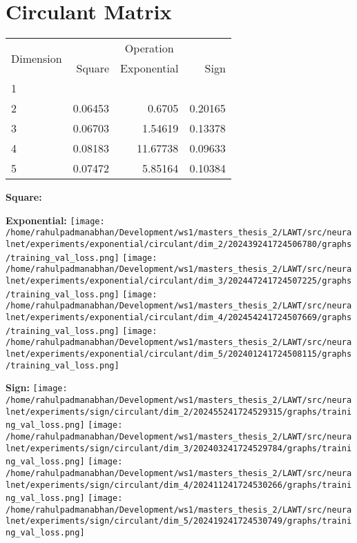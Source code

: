 \documentclass{article}
\begin{document}
\pagebreak
\section{Circulant Matrix}
\begin{tabular}{@{}lrrr@{}}
\toprule
\multirow{2}{*}{Dimension} & \multicolumn{3}{c}{Operation} \\
\cmidrule(l){2-4}
& Square & Exponential & Sign \\
\midrule
1 & & & \\
2 & 0.06453 & 0.6705 & 0.20165 \\
3 & 0.06703 & 1.54619 & 0.13378 \\
4 & 0.08183 & 11.67738 & 0.09633 \\
5 & 0.07472 & 5.85164 & 0.10384 \\
\bottomrule
\end{tabular}

\textbf{Square:}

\textbf{Exponential:}
\texttt{[image: /home/rahulpadmanabhan/Development/ws1/masters\_thesis\_2/LAWT/src/neuralnet/experiments/exponential/circulant/dim\_2/202439241724506780/graphs/training\_val\_loss.png]}
\texttt{[image: /home/rahulpadmanabhan/Development/ws1/masters\_thesis\_2/LAWT/src/neuralnet/experiments/exponential/circulant/dim\_3/202447241724507225/graphs/training\_val\_loss.png]}
\texttt{[image: /home/rahulpadmanabhan/Development/ws1/masters\_thesis\_2/LAWT/src/neuralnet/experiments/exponential/circulant/dim\_4/202454241724507669/graphs/training\_val\_loss.png]}
\texttt{[image: /home/rahulpadmanabhan/Development/ws1/masters\_thesis\_2/LAWT/src/neuralnet/experiments/exponential/circulant/dim\_5/202401241724508115/graphs/training\_val\_loss.png]}

\textbf{Sign:}
\texttt{[image: /home/rahulpadmanabhan/Development/ws1/masters\_thesis\_2/LAWT/src/neuralnet/experiments/sign/circulant/dim\_2/202455241724529315/graphs/training\_val\_loss.png]}
\texttt{[image: /home/rahulpadmanabhan/Development/ws1/masters\_thesis\_2/LAWT/src/neuralnet/experiments/sign/circulant/dim\_3/202403241724529784/graphs/training\_val\_loss.png]}
\texttt{[image: /home/rahulpadmanabhan/Development/ws1/masters\_thesis\_2/LAWT/src/neuralnet/experiments/sign/circulant/dim\_4/202411241724530266/graphs/training\_val\_loss.png]}
\texttt{[image: /home/rahulpadmanabhan/Development/ws1/masters\_thesis\_2/LAWT/src/neuralnet/experiments/sign/circulant/dim\_5/202419241724530749/graphs/training\_val\_loss.png]}
\end{document}
